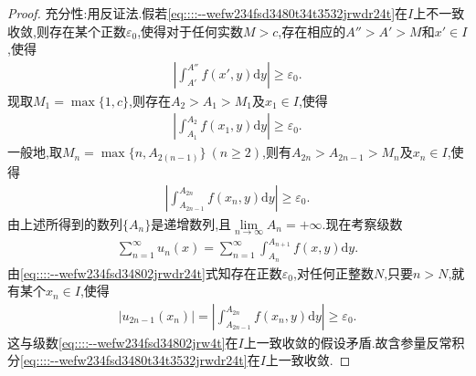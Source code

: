 \documentclass[../../main.tex]{subfiles}%
\begin{document}
\begin{proof}
{\heiti 充分性:}用反证法.假若\eqref{eq::::--wefw234fsd3480t34t3532jrwdr24t}在$I$上不一致收敛,则存在某个正数$\varepsilon_0$,使得对于任何实数$M > c$,存在相应的$A'' > A' > M$和$x' \in I$,使得
\begin{align*}
\left| \int_{A'}^{A''} f(x',y)\mathrm{d}y \right| \geqslant \varepsilon_0.
\end{align*}
现取$M_1 = \max\{1,c\}$,则存在$A_2 > A_1 > M_1$及$x_1 \in I$,使得
\begin{align*}
\left| \int_{A_1}^{A_2} f(x_1,y)\mathrm{d}y \right| \geqslant \varepsilon_0.
\end{align*}
一般地,取$M_n = \max\{n,A_{2(n-1)}\}\ (n \geqslant 2)$,则有$A_{2n} > A_{2n-1} > M_n$及$x_n \in I$,使得
\begin{align}
\left| \int_{A_{2n-1}}^{A_{2n}} f(x_n,y)\mathrm{d}y \right| \geqslant \varepsilon_0. \label{eq::::--wefw234fsd34802jrwdr24t}
\end{align}
由上述所得到的数列$\{A_n\}$是递增数列,且$\lim\limits_{n \to \infty} A_n = +\infty$.现在考察级数
\begin{align*}
\sum_{n=1}^{\infty} u_n(x) = \sum_{n=1}^{\infty} \int_{A_n}^{A_{n+1}} f(x,y)\mathrm{d}y.
\end{align*}
由\eqref{eq::::--wefw234fsd34802jrwdr24t}式知存在正数$\varepsilon_0$,对任何正整数$N$,只要$n > N$,就有某个$x_n \in I$,使得
\begin{align*}
|u_{2n-1}(x_n)| = \left| \int_{A_{2n-1}}^{A_{2n}} f(x_n,y)\mathrm{d}y \right| \geqslant \varepsilon_0.
\end{align*}
这与级数\eqref{eq::::--wefw234fsd34802jrw4t}在$I$上一致收敛的假设矛盾.故含参量反常积分\eqref{eq::::--wefw234fsd3480t34t3532jrwdr24t}在$I$上一致收敛.

\end{proof}
\end{document}
